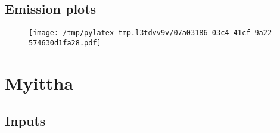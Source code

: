 \documentclass{article}%
\begin{document}
\subsection{Emission plots}%
\label{subsec:Emissionplots}%


\begin{figure}[htbp]%
\centering%
\texttt{[image: /tmp/pylatex-tmp.l3tdvv9v/07a03186-03c4-41cf-9a22-574630d1fa28.pdf]}%
\end{figure}

%
\section{Myittha}%
\label{sec:Myittha}%
\subsection{Inputs}%
\label{subsec:Inputs}%
\end{document}

